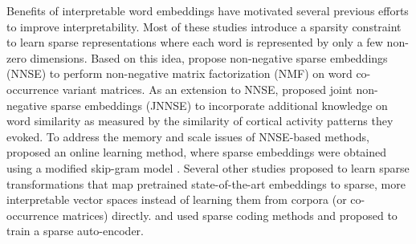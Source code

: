 \documentclass[11pt,a4paper]{article}
\begin{document}
Benefits of interpretable word embeddings have motivated several previous efforts  to improve interpretability. Most of these studies introduce a sparsity constraint  to learn sparse representations where each word is represented by only a few non-zero dimensions. 
Based on this idea, \citet{murphy12nnse} propose non-negative sparse embeddings (NNSE)  to perform non-negative matrix factorization (NMF) on word co-occurrence variant matrices. As an extension to NNSE, \citet{fyshe14interpretable} proposed joint non-negative sparse embeddings (JNNSE) to incorporate additional knowledge on word similarity as measured by the similarity of cortical activity patterns they evoked. To address the memory and scale issues of NNSE-based methods, \citet{luo15online} proposed an online learning method, where sparse embeddings were obtained using a modified skip-gram model \citep{mikolov13word2vec_a}. Several other studies proposed to learn sparse transformations that map pretrained state-of-the-art embeddings to sparse, more interpretable vector spaces instead of learning them from corpora (or co-occurrence matrices) directly. \citet{arora18linalg} and \citet{faruqui15sparse} used sparse coding methods and \citep{subramanian18spine} proposed to train a sparse auto-encoder.

\end{document}
